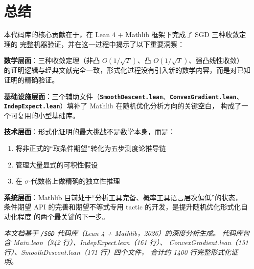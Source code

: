 \documentclass[12pt, a4paper]{article}
\newcommand{\file}[1]{\textbf{\texttt{#1}}}
\begin{document}
\section{总结}

本代码库的核心贡献在于，在 Lean 4 + Mathlib 框架下完成了 SGD 三种收敛定理的
完整机器验证，并在这一过程中揭示了以下重要洞察：

\textbf{数学层面}：三种收敛定理（非凸 $O(1/\sqrt{T})$、凸 $O(1/\sqrt{T})$、强凸线性收敛）
的证明逻辑与经典文献完全一致，形式化过程没有引入新的数学内容，而是对已知证明的精确验证。

\textbf{基础设施层面}：三个辅助文件（\file{SmoothDescent.lean}、\file{ConvexGradient.lean}、
\file{IndepExpect.lean}）填补了 Mathlib 在随机优化分析方向的关键空白，
构成了一个可复用的小型基础库。

\textbf{技术层面}：形式化证明的最大挑战不是数学本身，而是：
\begin{enumerate}
  \item 将非正式的``取条件期望''转化为五步测度论推导链
  \item 管理大量显式的可积性假设
  \item 在 $\sigma$-代数格上做精确的独立性推理
\end{enumerate}

\textbf{系统层面}：Mathlib 目前处于``分析工具完备、概率工具语言层次偏低''的状态，
条件期望 API 的完善和期望不等式专用 tactic 的开发，是提升随机优化形式化自动化程度
的两个最关键的下一步。

\bigskip

\noindent
\textit{本文档基于 \texttt{/SGD} 代码库（Lean 4 + Mathlib，2026）的深度分析生成。
代码库包含 Main.lean（942 行）、IndepExpect.lean（161 行）、
ConvexGradient.lean（131 行）、SmoothDescent.lean（171 行）四个文件，
合计约 1400 行完整形式化证明。}
\end{document}
